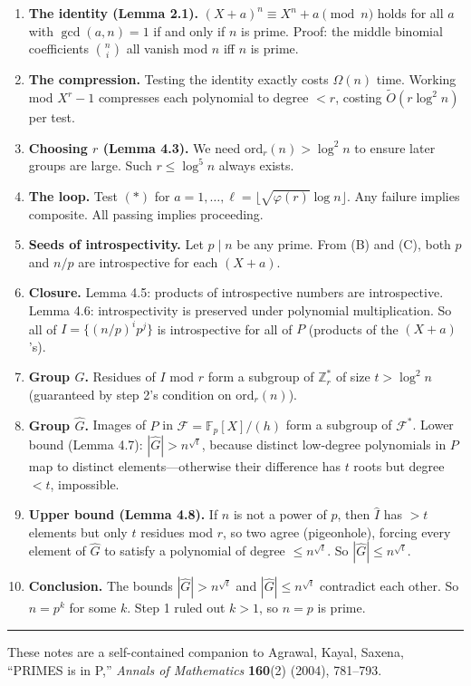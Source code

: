\documentclass[12pt]{article}
\newcommand{\Z}{\mathbb{Z}}
\newcommand{\ord}{\mathrm{ord}}
\newcommand{\OO}{\widetilde{O}}
\begin{document}
\begin{enumerate}[itemsep=6pt]
  \item \textbf{The identity (Lemma 2.1).} $(X+a)^n\equiv X^n+a\pmod{n}$ holds for all $a$ with $\gcd(a,n)=1$ if and only if $n$ is prime. Proof: the middle binomial coefficients $\binom{n}{i}$ all vanish mod $n$ iff $n$ is prime.

  \item \textbf{The compression.} Testing the identity exactly costs $\Omega(n)$ time. Working mod $X^r-1$ compresses each polynomial to degree $<r$, costing $\OO(r\log^2 n)$ per test.

  \item \textbf{Choosing $r$ (Lemma 4.3).} We need $\ord_r(n)>\log^2 n$ to ensure later groups are large. Such $r\leq\log^5 n$ always exists.

  \item \textbf{The loop.} Test $(*)$ for $a=1,\ldots,\ell=\lfloor\sqrt{\varphi(r)}\log n\rfloor$. Any failure implies composite. All passing implies proceeding.

  \item \textbf{Seeds of introspectivity.} Let $p\mid n$ be any prime. From (B) and (C), both $p$ and $n/p$ are introspective for each $(X+a)$.

  \item \textbf{Closure.} Lemma 4.5: products of introspective numbers are introspective. Lemma 4.6: introspectivity is preserved under polynomial multiplication. So all of $I=\{(n/p)^ip^j\}$ is introspective for all of $P$ (products of the $(X+a)$'s).

  \item \textbf{Group $G$.} Residues of $I$ mod $r$ form a subgroup of $\Z_r^*$ of size $t>\log^2 n$ (guaranteed by step 2's condition on $\ord_r(n)$).

  \item \textbf{Group $\hat{G}$.} Images of $P$ in $\mathcal{F}=\mathbb{F}_p[X]/(h)$ form a subgroup of $\mathcal{F}^*$. Lower bound (Lemma 4.7): $|\hat{G}|>n^{\sqrt{t}}$, because distinct low-degree polynomials in $P$ map to distinct elements---otherwise their difference has $t$ roots but degree $<t$, impossible.

  \item \textbf{Upper bound (Lemma 4.8).} If $n$ is not a power of $p$, then $\hat{I}$ has $>t$ elements but only $t$ residues mod $r$, so two agree (pigeonhole), forcing every element of $\hat{G}$ to satisfy a polynomial of degree $\leq n^{\sqrt{t}}$. So $|\hat{G}|\leq n^{\sqrt{t}}$.

  \item \textbf{Conclusion.} The bounds $|\hat{G}|>n^{\sqrt{t}}$ and $|\hat{G}|\leq n^{\sqrt{t}}$ contradict each other. So $n=p^k$ for some $k$. Step 1 ruled out $k>1$, so $n=p$ is prime.
\end{enumerate}

\vspace{1em}
\hrule
\vspace{0.5em}
\begin{center}
\small These notes are a self-contained companion to Agrawal, Kayal, Saxena,\\
``PRIMES is in P,'' \textit{Annals of Mathematics} \textbf{160}(2) (2004), 781--793.
\end{center}
\end{document}
